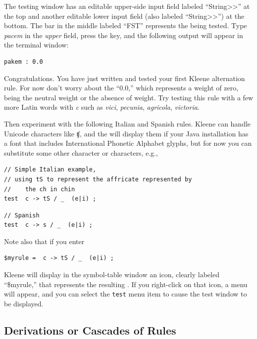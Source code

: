 The testing window has an editable upper-side input field labeled
\mbox{``String>\hspace{0pt}>''} at the top and another editable lower input field (also
labeled \mbox{``String>\hspace{0pt}>''}) at the bottom.  The
bar in the middle labeled ``FST'' represents the \fst{} being tested.  Type \emph{pacem} in the \emph{upper} field,
press the  key, and the following output will appear in the  terminal window:


\begin{Verbatim}
pakem : 0.0
\end{Verbatim}

\noindent
Congratulations.  You have just written
and tested your first Kleene alternation rule.  For now don't worry about the ``0.0,'' which
represents a weight of zero, being the neutral weight
or the absence of weight.    Try testing this rule with a few more Latin words with \emph{c} such as
\emph{vici}, \emph{pecunia},
\emph{agricola}, \emph{victoria}.

Then experiment with the following Italian and Spanish rules.  Kleene can handle Unicode characters
like ʧ, and the  will display them if your Java installation has a font
that includes International Phonetic Alphabet glyphs, but for now you
can substitute some other character or characters, e.g.,


\begin{Verbatim}
// Simple Italian example, 
// using tS to represent the affricate represented by 
//    the ch in chin
test  c -> tS / _  (e|i) ;
\end{Verbatim}

\begin{Verbatim}
// Spanish
test  c -> s / _  (e|i) ;
\end{Verbatim}


\noindent
Note also that if you enter

\begin{Verbatim}
$myrule =  c -> tS / _  (e|i) ;
\end{Verbatim}

\noindent
Kleene will display in the symbol-table window an icon, clearly labeled ``\$myrule,'' that represents the resulting
\fst{}.  If you right-click on that icon, a menu will appear, and you can select the \texttt{test} menu item to
cause the test window to be displayed.

\subsection{Derivations or Cascades of Rules}

